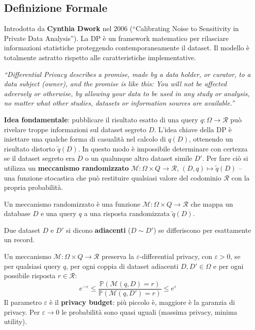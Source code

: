 \documentclass[a4paper,11pt]{article}
\begin{document}
\subsection{Definizione Formale}

Introdotta da \textbf{Cynthia Dwork} nel 2006 (``Calibrating Noise to Sensitivity in Private Data Analysis''). La DP \`{e} un framework matematico per rilasciare informazioni statistiche proteggendo contemporaneamente il dataset. Il modello \`{e} totalmente astratto rispetto alle caratteristiche implementative.

\begin{nota}
\emph{``Differential Privacy describes a promise, made by a data holder, or curator, to a data subject (owner), and the promise is like this: You will not be affected adversely or otherwise, by allowing your data to be used in any study or analysis, no matter what other studies, datasets or information sources are available.''}
\end{nota}

\textbf{Idea fondamentale}: pubblicare il risultato esatto di una query $q: \Omega \to \mathcal{R}$ pu\`{o} rivelare troppe informazioni sul dataset segreto $D$. L'idea chiave della DP \`{e} iniettare una qualche forma di casualit\`{a} nel calcolo di $q(D)$, ottenendo un risultato distorto $\tilde{q}(D)$. In questo modo \`{e} impossibile determinare con certezza se il dataset segreto era $D$ o un qualunque altro dataset simile $D'$. Per fare ci\`{o} si utilizza un \textbf{meccanismo randomizzato} $\mathcal{M}: \Omega \times Q \to \mathcal{R}$, $(D, q) \mapsto \tilde{q}(D)$ -- una funzione stocastica che pu\`{o} restituire qualsiasi valore del codominio $\mathcal{R}$ con la propria probabilit\`{a}.

\begin{definizione}
Un meccanismo randomizzato \`{e} una funzione $\mathcal{M}: \Omega \times Q \to \mathcal{R}$ che mappa un database $D$ e una query $q$ a una risposta randomizzata $\tilde{q}(D)$.
\end{definizione}

Due dataset $D$ e $D'$ si dicono \textbf{adiacenti} ($D \sim D'$) se differiscono per esattamente un record.

\begin{definizione}
Un meccanismo $\mathcal{M}: \Omega \times Q \to \mathcal{R}$ preserva la $\varepsilon$-differential privacy, con $\varepsilon > 0$, se per qualsiasi query $q$, per ogni coppia di dataset adiacenti $D, D' \in \Omega$ e per ogni possibile risposta $r \in \mathcal{R}$:
\[
e^{-\varepsilon} \leq \frac{\mathbb{P}(\mathcal{M}(q, D) = r)}{\mathbb{P}(\mathcal{M}(q, D') = r)} \leq e^{\varepsilon}
\]
Il parametro $\varepsilon$ \`{e} il \textbf{privacy budget}: pi\`{u} piccolo \`{e}, maggiore \`{e} la garanzia di privacy. Per $\varepsilon \to 0$ le probabilit\`{a} sono quasi uguali (massima privacy, minima utility).
\end{definizione}
\end{document}
